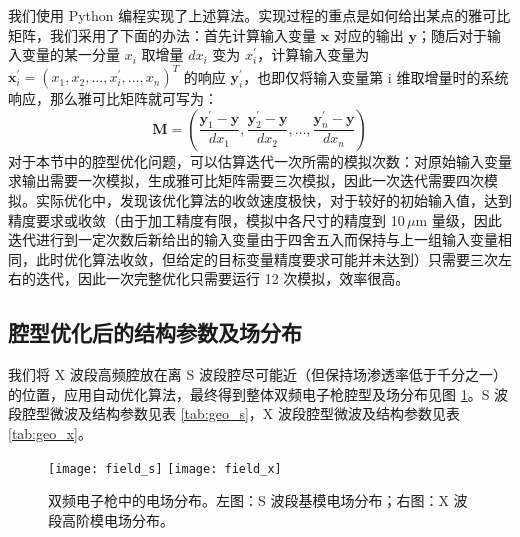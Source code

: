 我们使用 Python 编程实现了上述算法。实现过程的重点是如何给出某点的雅可比矩阵，我们采用了下面的办法：首先计算输入变量 $\mathbf{x}$ 对应的输出 $\mathbf{y}$；随后对于输入变量的某一分量 $x_i$ 取增量 $dx_i$ 变为 $x_i^{\prime}$，计算输入变量为 $\mathbf{x}_i^{\prime} = (x_1, x_2,\dots,x_i^{\prime},\dots,x_n)^T$ 的响应 $\mathbf{y}_i^{\prime}$，也即仅将输入变量第 i 维取增量时的系统响应，那么雅可比矩阵就可写为：
\begin{equation}
\label{eq:jacob}
\mathbf{M} = \left(\frac{\mathbf{y}_1^{\prime}-\mathbf{y}}{dx_1}, \frac{\mathbf{y}_2^{\prime}-\mathbf{y}}{dx_2}, \dots, \frac{\mathbf{y}_n^{\prime}-\mathbf{y}}{dx_n}\right)
\end{equation}
对于本节中的腔型优化问题，可以估算迭代一次所需的模拟次数：对原始输入变量求输出需要一次模拟，生成雅可比矩阵需要三次模拟，因此一次迭代需要四次模拟。实际优化中，发现该优化算法的收敛速度极快，对于较好的初始输入值，达到精度要求或收敛（由于加工精度有限，模拟中各尺寸的精度到 10\,$\mu$m 量级，因此迭代进行到一定次数后新给出的输入变量由于四舍五入而保持与上一组输入变量相同，此时优化算法收敛，但给定的目标变量精度要求可能并未达到）只需要三次左右的迭代，因此一次完整优化只需要运行 12 次模拟，效率很高。

\subsection{腔型优化后的结构参数及场分布}
我们将 X 波段高频腔放在离 S 波段腔尽可能近（但保持场渗透率低于千分之一）的位置，应用自动优化算法，最终得到整体双频电子枪腔型及场分布见图 \ref{fig:field_sx}。S 波段腔型微波及结构参数见表 \ref{tab:geo_s}，X 波段腔型微波及结构参数见表 \ref{tab:geo_x}。
\begin{figure}[htbp]
	\centering
	\texttt{[image: field\_s]}
	\texttt{[image: field\_x]}
	\caption{
	双频电子枪中的电场分布。左图：S 波段基模电场分布；右图：X 波段高阶模电场分布。}
	\label{fig:field_sx}
\end{figure}

